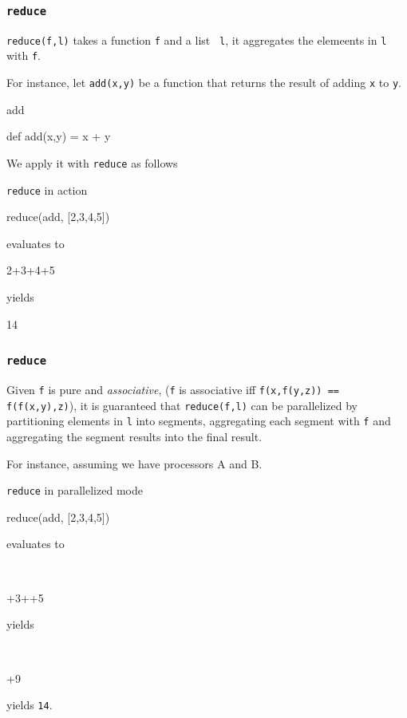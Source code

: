 \documentclass{beamer}
\newcommand{\beb}{\begin{exampleblock}}
\newcommand{\eeb}{\end{exampleblock}}
\newcommand{\magtxt}[1]{{\magenta #1}}
\newcommand{\bluetxt}[1]{{\blue #1}}
\newenvironment{ttprog}{\begin{trivlist}\item \tt
        \begin{tabbing}}{\end{tabbing}\end{trivlist}}
\begin{document}



\begin{frame}[fragile]
\frametitle{{\tt reduce}}

{\tt reduce(f,l)} takes a  function {\tt f} and a list {\tt
  l}, it aggregates the elemeents in {\tt l} with {\tt f}.


For instance, let {\tt add(x,y)} be a function that returns the result
of adding {\tt x} to {\tt y}. 
\beb{add}
\begin{code}
def add(x,y) = x + y
\end{code}
\eeb
We apply it with {\tt reduce} as follows
\beb{{\tt reduce} in action}
\begin{code}
reduce(add, [2,3,4,5])
\end{code}
\eeb
evaluates to 
\beb{}
\begin{code}
2+3+4+5
\end{code}
\eeb
yields
\beb{}
\begin{code}
14
\end{code}
\eeb


\end{frame}

\begin{frame}[fragile]
\frametitle{{\tt reduce}}

Given {\tt f} is pure and {\em associative}, ({\tt f} is associative
iff {\tt f(x,f(y,z)) == f(f(x,y),z)}), it is guaranteed that {\tt reduce(f,l)}
can be parallelized by partitioning elements in {\tt l} into segments,
aggregating each segment with {\tt f} and aggregating the segment
results into the final result.

 For instance, assuming we have processors \magtxt{A} and \bluetxt{B}.
\beb{{\tt reduce} in parallelized mode}
\begin{code}
reduce(add, [2,3,4,5])
\end{code}
\eeb
evaluates to 
\beb{}
\begin{ttprog}
\magtxt{2+3}+\bluetxt{4+5}
\end{ttprog}
\eeb
yields
\beb{}
\begin{ttprog}
\magtxt{5+9}
\end{ttprog}
\eeb
yields {\tt 14}.
\end{frame}
\end{document}

